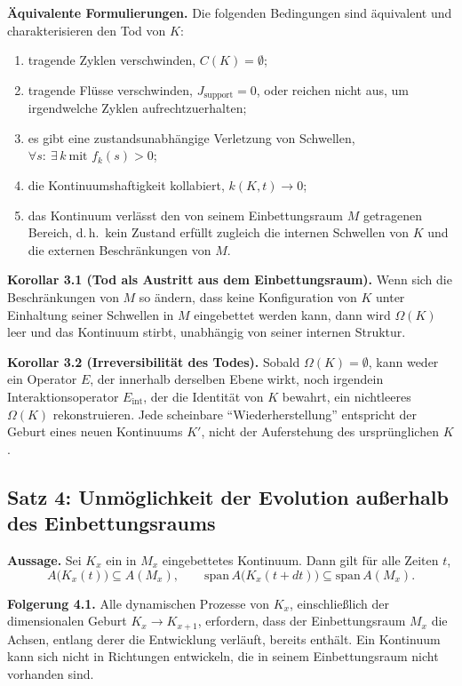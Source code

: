 \textbf{Äquivalente Formulierungen.}
Die folgenden Bedingungen sind äquivalent und charakterisieren den Tod von \(K\):
\begin{enumerate}
    \item tragende Zyklen verschwinden, \(C(K) = \emptyset\);
    \item tragende Flüsse verschwinden, \(J_{\mathrm{support}} = 0\), oder reichen nicht aus, um irgendwelche Zyklen aufrechtzuerhalten;
    \item es gibt eine zustandsunabhängige Verletzung von Schwellen, \(\forall s:\ \exists\,k\ \text{mit } f_k(s) > 0\);
    \item die Kontinuumshaftigkeit kollabiert, \(k(K,t) \to 0\);
    \item das Kontinuum verlässt den von seinem Einbettungsraum \(M\) getragenen Bereich, d.\,h.\ kein Zustand erfüllt zugleich die internen Schwellen von \(K\) und die externen Beschränkungen von \(M\).
\end{enumerate}

\textbf{Korollar 3.1 (Tod als Austritt aus dem Einbettungsraum).}
Wenn sich die Beschränkungen von \(M\) so ändern, dass keine Konfiguration von \(K\) unter Einhaltung seiner Schwellen in \(M\) eingebettet werden kann, dann wird \(\Omega(K)\) leer und das Kontinuum stirbt, unabhängig von seiner internen Struktur.

\textbf{Korollar 3.2 (Irreversibilität des Todes).}
Sobald \(\Omega(K) = \emptyset\), kann weder ein Operator \(E\), der innerhalb derselben Ebene wirkt, noch irgendein Interaktionsoperator \(E_{\mathrm{int}}\), der die Identität von \(K\) bewahrt, ein nichtleeres \(\Omega(K)\) rekonstruieren.
Jede scheinbare ``Wiederherstellung'' entspricht der Geburt eines neuen Kontinuums \(K'\), nicht der Auferstehung des ursprünglichen \(K\).

\subsection{Satz 4: Unmöglichkeit der Evolution außerhalb des Einbettungsraums}

\textbf{Aussage.}
Sei \(K_x\) ein in \(M_x\) eingebettetes Kontinuum.
Dann gilt für alle Zeiten \(t\),
\[
    A\big(K_x(t)\big) \subseteq A(M_x),
    \qquad
    \mathrm{span}\,A\big(K_x(t+dt)\big) \subseteq \mathrm{span}\,A(M_x).
\]

\textbf{Folgerung 4.1.}
Alle dynamischen Prozesse von \(K_x\), einschließlich der dimensionalen Geburt \(K_x \to K_{x+1}\), erfordern, dass der Einbettungsraum \(M_x\) die Achsen, entlang derer die Entwicklung verläuft, bereits enthält.
Ein Kontinuum kann sich nicht in Richtungen entwickeln, die in seinem Einbettungsraum nicht vorhanden sind.

